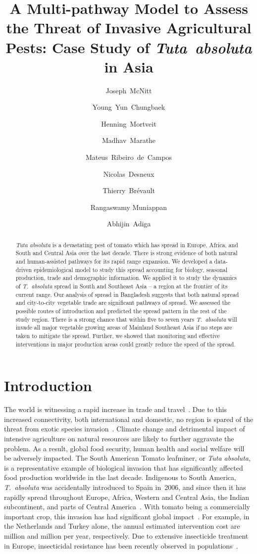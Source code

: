 \documentclass[11pt]{article}
\title{A Multi-pathway Model to Assess the Threat of Invasive Agricultural
Pests: Case Study of \emph{Tuta~absoluta} in Asia}
\author[1]{Joseph~McNitt}
\author[1]{Young~Yun~Chungbaek}
\author[1]{Henning~Mortveit}
\author[1]{Madhav~Marathe}
\author[2]{Mateus~Ribeiro~de~Campos}
\author[2]{Nicolas~Desneux}
\author[3,4,5]{Thierry~Br\'{e}vault}
\author[6]{Rangaswamy Muniappan}
\author[1]{Abhijin~Adiga}
\affil[1]{Biocomplexity Institute of Virginia Tech}
\affil[2]{French National Institute for Agricultural Research}
\affil[3]{BIOPASS, CIRAD-IRD-ISRA-UCAD, Dakar, Senegal}
\affil[4]{CIRAD, UPR AIDA, F-34398 Montpellier, France}
\affil[5]{Universit\'{e} de Montpellier, CIRAD, Montpellier, France}
\affil[6]{Feed the Future Integrated Pest Management Innovation Lab}
\date{}
\newcommand{\tuta}{\emph{T.~absoluta}}
\theoremstyle{definition}
\begin{document}
\maketitle

\begin{abstract}
\emph{Tuta absoluta} is a devastating pest of tomato which has spread in
Europe, Africa, and South and Central Asia over the last decade. There is
strong evidence of both natural and human-assisted pathways for its rapid
range expansion. We developed a data-driven epidemiological model to study
this spread accounting for biology, seasonal production, trade and
demographic information. We applied it to study the dynamics of \tuta{}
spread in South and Southeast Asia -- a region at the frontier of its
current range.  Our analysis of spread in Bangladesh suggests that both
natural spread and city-to-city vegetable trade are significant pathways of
spread. We assessed the possible routes of introduction and predicted the
spread pattern in the rest of the study region. There is a strong chance
that within five to seven years \tuta{} will invade all major vegetable
growing areas of Mainland Southeast Asia if no steps are taken to mitigate
the spread. Further, we showed that monitoring and effective interventions
in major production areas could greatly reduce the speed of the spread.
\end{abstract}
\section{Introduction}
The world is witnessing a rapid increase in trade and
travel~\cite{ercsey2012complexity}. Due to this increased connectivity,
both international and domestic, no region is spared of the threat from
exotic species invasion~\cite{hulme2009trade}.  Climate change and
detrimental impact of intensive agriculture on natural resources are likely
to further aggravate the problem. As a result, global food security, human
health and social welfare will be adversely impacted. The South American
Tomato leafminer, or \emph{Tuta absoluta}, is a representative example of
biological invasion that has significantly affected food production
worldwide in the last decade.  Indigenous to South America, \tuta{} was
accidentally introduced to Spain in~2006, and since then it has rapidly
spread throughout Europe, Africa, Western and Central Asia, the Indian
subcontinent, and parts of Central
America~\cite{desneux2010biological,biondi2017}. With tomato being a
commercially important crop, this invasion has had significant global
impact~\cite{campos2017western}. For example, in the Netherlands and Turkey
alone, the annual estimated intervention cost are  million and
 million per year, respectively. Due to extensive insecticide
treatment in Europe, insecticidal resistance has been recently observed in
populations~\cite{guedes2013tomato}.
\end{document}
